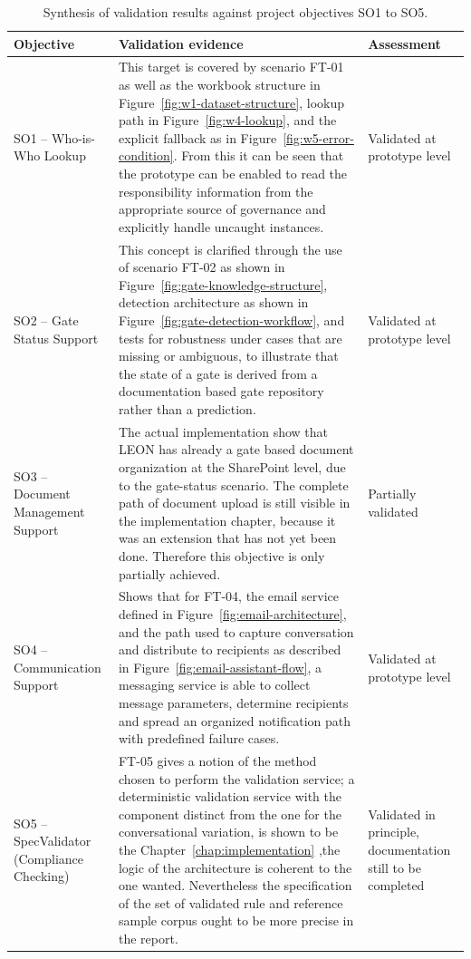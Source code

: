 \begin{table}[H]
\centering
\footnotesize
\renewcommand{\arraystretch}{1.25}
\caption{Synthesis of validation results against project objectives SO1 to SO5.}
\label{tab:results-vs-objectives}
\begin{tabularx}{\textwidth}{|p{2.5cm}|X|p{2.5cm}|}
\hline
\rowcolor[HTML]{E6F2FF}\textcolor[HTML]{003D99}{\textbf{Objective}} & \textcolor[HTML]{003D99}{\textbf{Validation evidence}} & \textcolor[HTML]{003D99}{\textbf{Assessment}} \\
\hline
SO1 -- Who-is-Who Lookup & This target is covered by scenario FT-01 as well as the workbook structure in Figure~\ref{fig:w1-dataset-structure}, lookup path in Figure~\ref{fig:w4-lookup}, and the explicit fallback as in Figure~\ref{fig:w5-error-condition}.  From this it can be seen that the prototype can be enabled to read the responsibility information from the appropriate source of governance and explicitly handle uncaught instances. & Validated at prototype level \\
\hline
SO2 -- Gate Status Support & This concept is clarified through the use of scenario FT-02 as shown in Figure~\ref{fig:gate-knowledge-structure}, detection architecture as shown in Figure~\ref{fig:gate-detection-workflow}, and tests for robustness under cases that are missing or ambiguous, to illustrate that the state of a gate is derived from a documentation based gate repository rather than a prediction. & Validated at prototype level \\
\hline
SO3 -- Document Management Support & The actual implementation show that LEON has already a gate based document organization at the SharePoint level, due to the gate-status scenario. The complete path of document upload is still visible in the implementation chapter, because it was an extension that has not yet been done. Therefore this objective is only partially achieved. & Partially validated \\
\hline
SO4 -- Communication Support & Shows that for FT-04, the email service defined in Figure~\ref{fig:email-architecture}, and the path used to capture conversation and distribute to recipients as described in Figure~\ref{fig:email-assistant-flow}, a messaging service is able to collect message parameters, determine recipients and spread an organized notification path with predefined failure cases. & Validated at prototype level \\
\hline
SO5 -- SpecValidator (Compliance Checking) & FT-05 gives a notion of the method chosen to perform the validation service; a deterministic validation service with the component distinct from the one for the conversational variation, is shown to be the Chapter~\ref{chap:implementation} ,the logic of the architecture is coherent to the one wanted. Nevertheless the specification of the set of validated rule and reference sample corpus ought to be more precise in the report. & Validated in principle, documentation still to be completed \\
\hline
\end{tabularx}
\end{table}

